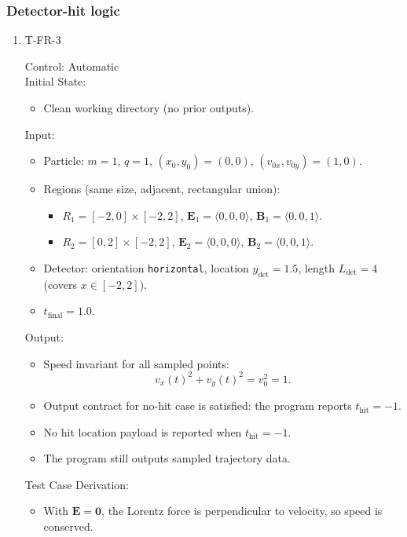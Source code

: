 \documentclass[12pt, titlepage]{article}
\begin{document}
\subsubsection{Detector-hit logic }

\begin{enumerate}

\item{T-FR-3\\}

Control: Automatic\\

Initial State:
\begin{itemize}
  \item Clean working directory (no prior outputs).
\end{itemize}

Input:
\begin{itemize}
  \item Particle: $m=1$, $q=1$, $(x_0,y_0)=(0,0)$, $(v_{0x},v_{0y})=(1,0)$.
  \item Regions (same size, adjacent, rectangular union):
  \begin{itemize}
    \item $R_1=[-2,0]\times[-2,2]$, $\mathbf{E}_1=\langle 0,0,0\rangle$,
    $\mathbf{B}_1=\langle 0,0,1\rangle$.
    \item $R_2=[0,2]\times[-2,2]$, $\mathbf{E}_2=\langle 0,0,0\rangle$,
    $\mathbf{B}_2=\langle 0,0,1\rangle$.
  \end{itemize}
  \item Detector: orientation \texttt{horizontal}, location
  $y_{\mathrm{det}}=1.5$, length $L_{\mathrm{det}}=4$ (covers $x\in[-2,2]$).
  \item $t_{\text{final}}=1.0$.
\end{itemize}

Output:
\begin{itemize}
  \item Speed invariant for all sampled points:
  \[
    v_x(t)^2+v_y(t)^2 = v_0^2 = 1.
  \]
  \item Output contract for no-hit case is satisfied:
  the program reports $t_{\mathrm{hit}}=-1$.
  \item No hit location payload is reported when $t_{\mathrm{hit}}=-1$.
  \item The program still outputs sampled trajectory data.
\end{itemize}

Test Case Derivation:
\begin{itemize}
  \item With $\mathbf{E}=\mathbf{0}$, the Lorentz force is perpendicular to velocity, so speed is conserved.
\end{itemize}


\end{enumerate}
\end{document}

